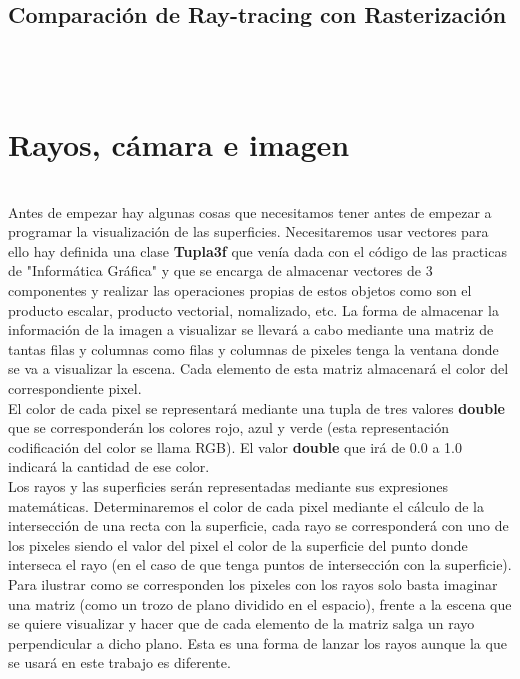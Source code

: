 ${ }$\\
\subsection{Comparación de Ray-tracing con Rasterización}
${ }$\\


${ }$\\
\section{Rayos, cámara e imagen}
${ }$\\

Antes de empezar hay algunas cosas que necesitamos tener antes de empezar a programar la visualización de las superficies. Necesitaremos usar vectores para ello hay definida una clase \textbf{Tupla3f} que venía dada con el código de las practicas de "Informática Gráfica" y que se encarga de almacenar vectores de 3 componentes y realizar las operaciones propias de estos objetos como son el producto escalar, producto vectorial, nomalizado, etc. La forma de almacenar la información de la imagen a visualizar se llevará a cabo mediante una matriz de tantas filas y columnas como filas y columnas de pixeles tenga la ventana donde se va a visualizar la escena. Cada elemento de esta matriz almacenará el color del correspondiente pixel.
	${ }$\\	
	
El color de cada pixel se representará mediante una tupla de tres valores \textbf{double} que se corresponderán los colores rojo, azul y verde (esta representación codificación del color se llama RGB). El valor \textbf{double} que irá de 0.0 a 1.0 indicará la cantidad de ese color.
	${ }$\\	
	
Los rayos y las superficies serán representadas mediante sus expresiones matemáticas. Determinaremos el color de cada pixel mediante el cálculo de la intersección de una recta con la superficie, cada rayo se corresponderá con uno de los pixeles siendo el valor del pixel el color de la superficie del punto donde interseca el rayo (en el caso de que tenga puntos de intersección con la superficie). Para ilustrar como se corresponden los pixeles con los rayos solo basta imaginar una matriz (como un trozo de plano dividido en el espacio), frente a la escena que se quiere visualizar y hacer que de cada elemento de la matriz salga un rayo perpendicular a dicho plano. Esta es una forma de lanzar los rayos aunque la que se usará en este trabajo es diferente.
	${ }$\\	
	
